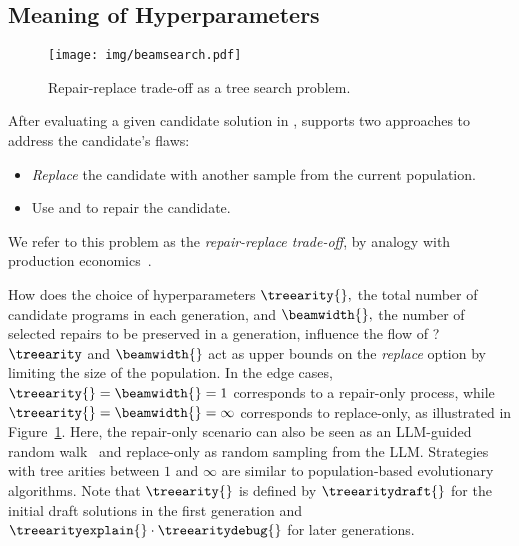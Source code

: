\subsection{Meaning of Hyperparameters}
\label{sec:beam-search}

\begin{figure}[t]
    \centering
    \texttt{[image: img/beamsearch.pdf]}
    \caption{Repair-replace trade-off as a tree search problem.}
    \label{fig:beam-search}
\end{figure}

After evaluating a given candidate solution in \execute{}, \method{} supports two approaches to address the candidate's flaws:
\begin{itemize}
\setlength{\parskip}{0pt}
\setlength\itemsep{0pt}
  \item \emph{Replace} the candidate with another sample from the current population.
  \item Use \instruct{} and \debug{} to repair the candidate.
\end{itemize}
We refer to this problem as the \emph{repair-replace trade-off}, by analogy with production economics~\cite{jack2000:optimal}. 

How does the choice of hyperparameters $\treearity{},$ the total number of candidate programs in each generation, and $\beamwidth{},$ the number of selected repairs to be preserved in a generation, influence the flow of \method{}?
$\treearity$ and $\beamwidth{}$ act as upper bounds on the \emph{replace} option by limiting the size of the population.
In the edge cases, $\treearity{} = \beamwidth{} = 1$ corresponds to a repair-only process, while $\treearity{} = \beamwidth{} = \infty$ corresponds to replace-only, as illustrated in Figure~\ref{fig:beam-search}. 
Here, the repair-only scenario can also be seen as an LLM-guided random walk~\cite{xia2020:random} and replace-only as random sampling from the LLM.
Strategies with tree arities between $1$ and $\infty$ are similar to population-based evolutionary algorithms.
Note that $\treearity{}$ is defined by $\treearitydraft{}$ for the initial draft solutions in the first generation and $\treearityexplain{} \cdot \treearitydebug{}$ for later generations. 

